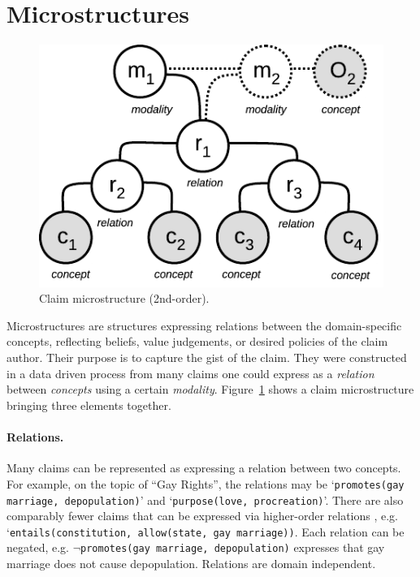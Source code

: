 \section{Microstructures}
\label{sec:for_microstructures}

\begin{figure}
	\begin{center}
      \includegraphics[scale=1]{microstructure.pdf}
      \end{center}
      \caption{Claim microstructure (2nd-order).}
  \label{fig:structures_flowchart}
\end{figure}

Microstructures are structures expressing relations between the domain-specific
concepts, reflecting beliefs, value judgements, or desired policies of the claim
author. Their purpose is to capture the gist of the claim. 
They were constructed in a data driven process
from many claims one could express as a \emph{relation}
between \emph{concepts} using a certain \emph{modality}. 
Figure~\ref{fig:structures_flowchart} shows a claim microstructure bringing three elements 
together. 

\paragraph{Relations. }  Many claims can be represented as expressing a
relation between two concepts. For example, on the topic of ``Gay Rights'', 
the relations may be `\texttt{promotes(gay marriage, depopulation)}' and 
`\texttt{purpose(love, procreation)}'. 
There are also comparably fewer claims that can be expressed via
higher-order relations , e.g. `\texttt{entails(constitution, allow(state, gay marriage))}. 
Each relation can be negated, e.g. $\neg$\texttt{promotes(gay marriage,
depopulation)} expresses that gay marriage does not cause depopulation. 
Relations are domain independent. 

